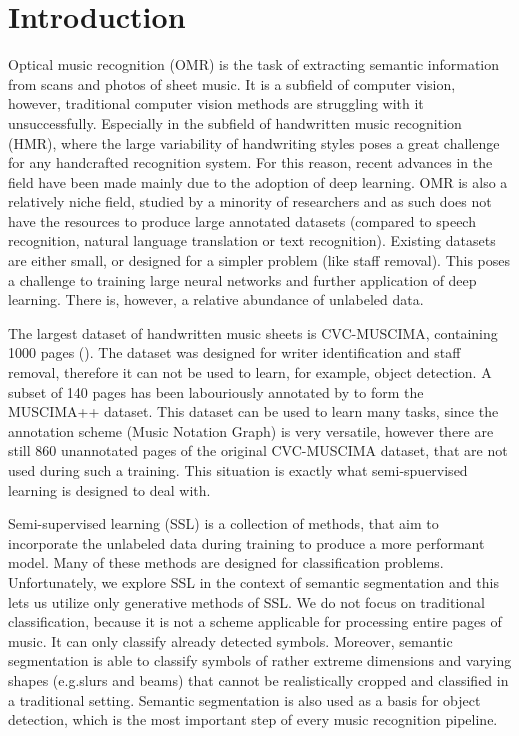 \chapter{Introduction}
\label{chap:Introduction}

Optical music recognition (OMR) is the task of extracting semantic information from scans and photos of sheet music. It is a subfield of computer vision, however, traditional computer vision methods are struggling with it unsuccessfully. Especially in the subfield of handwritten music recognition (HMR), where the large variability of handwriting styles poses a great challenge for any handcrafted recognition system. For this reason, recent advances in the field have been made mainly due to the adoption of deep learning. OMR is also a relatively niche field, studied by a minority of researchers and as such does not have the resources to produce large annotated datasets (compared to speech recognition, natural language translation or text recognition). Existing datasets are either small, or designed for a simpler problem (like staff removal). This poses a challenge to training large neural networks and further application of deep learning. There is, however, a relative abundance of unlabeled data.

The largest dataset of handwritten music sheets is CVC-MUSCIMA, containing 1000 pages (\cite{CvcMuscima}). The dataset was designed for writer identification and staff removal, therefore it can not be used to learn, for example, object detection. A subset of 140 pages has been labouriously annotated by \cite{MuscimaPP} to form the MUSCIMA++ dataset. This dataset can be used to learn many tasks, since the annotation scheme (Music Notation Graph) is very versatile, however there are still 860 unannotated pages of the original CVC-MUSCIMA dataset, that are not used during such a training. This situation is exactly what semi-spuervised learning is designed to deal with.

Semi-supervised learning (SSL) is a collection of methods, that aim to incorporate the unlabeled data during training to produce a more performant model. Many of these methods are designed for classification problems. Unfortunately, we explore SSL in the context of semantic segmentation and this lets us utilize only generative methods of SSL. We do not focus on traditional classification, because it is not a scheme applicable for processing entire pages of music. It can only classify already detected symbols. Moreover, semantic segmentation is able to classify symbols of rather extreme dimensions and varying shapes (e.g.\@ slurs and beams) that cannot be realistically cropped and classified in a traditional setting. Semantic segmentation is also used as a basis for object detection, which is the most important step of every music recognition pipeline.

